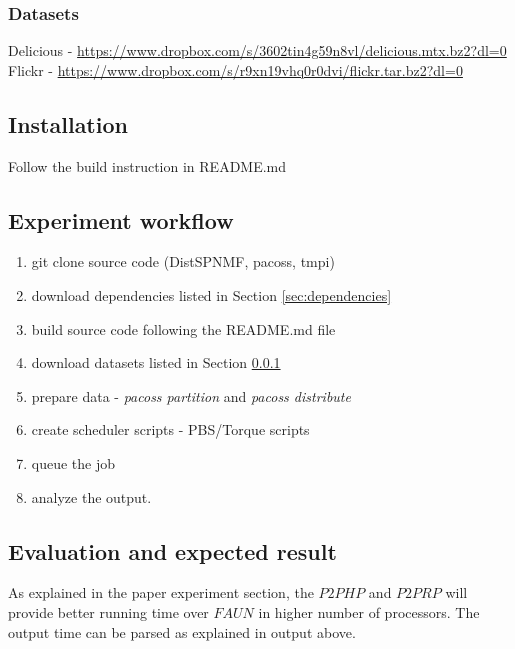 \documentclass[sigconf, review=false]{acmart}
\begin{document}
\subsubsection{Datasets} \label{sec:datasets} 

Delicious - \url{https://www.dropbox.com/s/3602tin4g59n8vl/delicious.mtx.bz2?dl=0}
Flickr - \url{https://www.dropbox.com/s/r9xn19vhq0r0dvi/flickr.tar.bz2?dl=0}

\subsection{Installation} 

Follow the build instruction in README.md

\subsection{Experiment workflow}

\begin{enumerate}
\item git clone source code (DistSPNMF, pacoss, tmpi)
\item download dependencies listed in Section \ref{sec:dependencies}
\item build source code following the README.md file
\item download datasets listed in Section \ref{sec:datasets}
\item prepare data - {\em pacoss partition} and {\em pacoss distribute}
\item create scheduler scripts - PBS/Torque scripts
\item queue the job 
\item analyze the output.
\end{enumerate}

\subsection{Evaluation and expected result} 

As explained in the paper experiment section, the $P2PHP$ and $P2PRP$ will provide better running time over $FAUN$ in higher number of processors. The output time can be parsed as explained in output above. 

\end{document}
